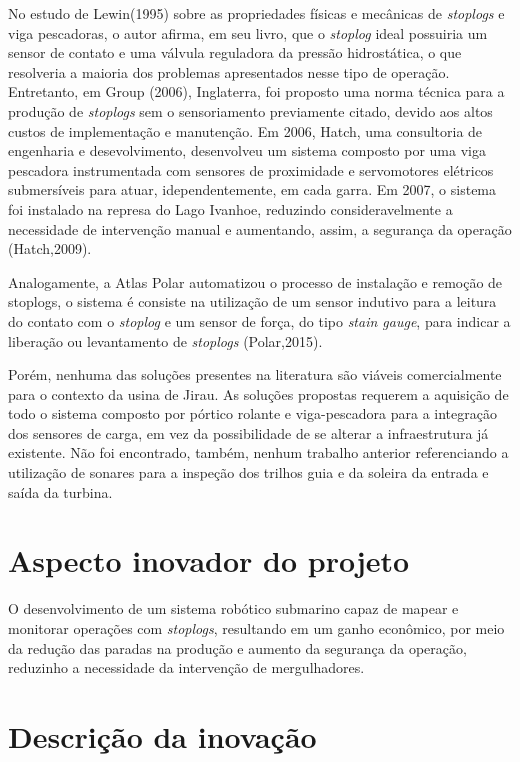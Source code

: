 No estudo de Lewin(1995) sobre as propriedades físicas e mecânicas de 
\textit{stoplogs} e viga pescadoras, o autor afirma, em seu livro, que o
\textit{stoplog} ideal possuiria um sensor de contato e uma válvula reguladora
da pressão hidrostática, o que resolveria a maioria dos problemas apresentados
nesse tipo de operação. Entretanto, em Group (2006), Inglaterra, foi proposto
uma norma técnica para a produção de \textit{stoplogs} sem o sensoriamento
previamente citado, devido aos altos custos de implementação e manutenção. Em
2006, Hatch, uma consultoria de engenharia e desevolvimento, desenvolveu um
sistema composto por uma viga pescadora instrumentada com sensores de
proximidade e servomotores elétricos submersíveis para atuar, idependentemente,
em cada garra. Em 2007, o sistema foi instalado na represa do Lago Ivanhoe,
reduzindo consideravelmente a necessidade de intervenção manual e aumentando,
assim, a segurança da operação (Hatch,2009).

Analogamente, a Atlas Polar automatizou o processo de instalação e remoção de
stoplogs, o sistema é consiste na utilização de um sensor indutivo para a
leitura do contato com o \textit{stoplog} e um sensor de força, do tipo
\textit{stain gauge}, para indicar a liberação ou levantamento de
\textit{stoplogs} (Polar,2015).

Porém, nenhuma das soluções presentes na literatura são viáveis comercialmente
para o contexto da usina de Jirau. As soluções propostas requerem a aquisição de todo o
sistema composto por pórtico rolante e viga-pescadora para a integração dos
sensores de carga, em vez da possibilidade de se alterar a infraestrutura já
existente.
Não foi encontrado, também, nenhum trabalho anterior referenciando a utilização
de sonares para a inspeção dos trilhos guia e da soleira da entrada e saída da turbina.

\section*{Aspecto inovador do projeto}

O desenvolvimento de um sistema robótico submarino capaz de mapear e monitorar
operações com \textit{stoplogs}, resultando em um ganho econômico, por meio da
redução das paradas na produção e aumento da segurança da operação,
reduzinho a necessidade da intervenção de mergulhadores.

\section*{Descrição da inovação}

